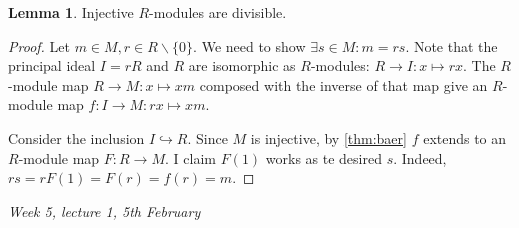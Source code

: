 \documentclass{article}
\theoremstyle{definition}
\newtheorem{lemma}[defn]{Lemma}
\begin{document}
\begin{lemma}
\label{lemma:injmodarediv}
Injective $R$-modules are divisible.
\end{lemma}
\begin{proof}
Let $m\in M,r\in R\backslash\{0\}$. We need to show $\exists s\in M:m=rs$. Note that the principal ideal $I=rR$ and $R$ are isomorphic as $R$-modules: $R\rightarrow I:x\mapsto rx$. The $R$-module map $R\rightarrow M:x\mapsto xm$ composed with the inverse of that map give an $R$-module map $f:I\rightarrow M:rx\mapsto xm$.

Consider the inclusion $I\hookrightarrow R$. Since $M$ is injective, by \ref{thm:baer} $f$ extends to an $R$-module map $F:R\rightarrow M$. I claim $F(1)$ works as te desired $s$. Indeed, $rs=rF(1)=F(r)=f(r)=m$.
\end{proof}

\begin{flushright}
\textit{Week 5, lecture 1, 5th February}
\end{flushright}
\end{document}
